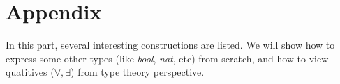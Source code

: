 \section*{Appendix}

In this part, several interesting constructions are listed.
We will show how to express some other types (like {\it bool}, {\it nat}, etc) from scratch,
and how to view quatitives ($\forall,\exists$) from type theory perspective.

